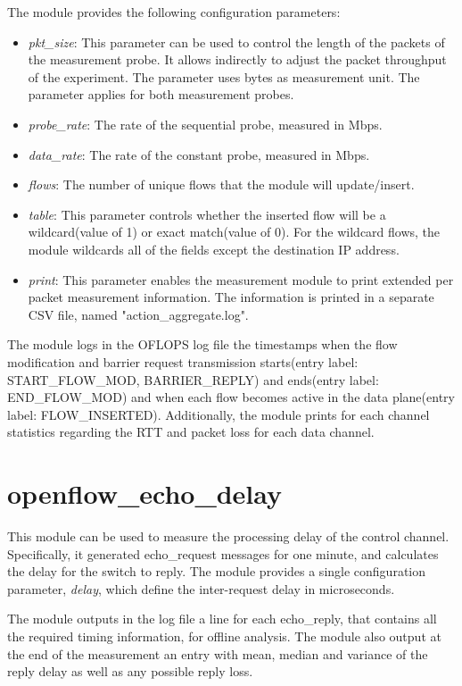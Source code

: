 \documentclass{book}
\begin{document}
The module provides the following configuration parameters: 
\begin{itemize}
    \item \emph{pkt\_size}: This parameter can be used to control the length of the
        packets of the measurement probe. It allows indirectly to adjust the packet
        throughput of the experiment. The parameter uses bytes as measurement unit.
        The parameter applies for both measurement probes. 
    \item \emph{probe\_rate}: The rate of the sequential probe, measured in Mbps. 
    \item \emph{data\_rate}: The rate of the constant probe, measured in Mbps. 
    \item \emph{flows}:  The number of unique flows that the module will
        update/insert.
    \item \emph{table}:  This parameter controls whether the inserted flow will be
        a wildcard(value of 1) or exact match(value of 0). For the wildcard flows, the
        module wildcards all of the fields except the destination IP address. 
    \item \emph{print}: This parameter enables the measurement module to print
        extended per packet measurement information. The information is printed in a
        separate CSV file, named "action\_aggregate.log".
\end{itemize}

The module logs in the OFLOPS log file the timestamps when the flow
modification and barrier request transmission starts(entry label:
START\_FLOW\_MOD, BARRIER\_REPLY) 
and ends(entry label: END\_FLOW\_MOD) and when each flow becomes active in the data 
plane(entry label: FLOW\_INSERTED). Additionally, the module prints for each
channel statistics regarding the RTT and packet loss for each data channel. 

\section{openflow\_echo\_delay}

This module can be used to measure the processing delay of the control channel.
Specifically, it generated echo\_request messages for one minute, and calculates the delay
for the switch to reply. The module provides a single configuration 
parameter, \emph{delay}, which define the inter-request delay in microseconds. 

The module outputs in the log file a line for each echo\_reply, that
contains all the required timing information, for offline analysis. The
module also output at the end of the measurement an entry with mean, median and
variance of the reply delay as well as any possible reply loss. 
\end{document}
